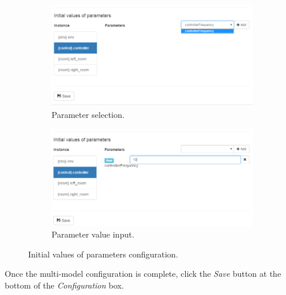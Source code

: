 %
%
%
\begin{figure}[ht]
  \centering
  \begin{subfigure}[b]{0.8\textwidth}
    \includegraphics[width=\textwidth]{figures/app/mm-params}
    \caption{Parameter selection.}
    \label{fig:mm-params1}
  \end{subfigure}
  \quad
  \begin{subfigure}[b]{0.8\textwidth}
    \includegraphics[width=\textwidth]{figures/app/mm-params2}
    \caption{Parameter value input.} 
    \label{fig:mm-params2}
  \end{subfigure}
  \caption{Initial values of parameters configuration.}
  \label{fig:mm-params}
\end{figure}
%
%
%
Once the multi-model configuration is complete, click the \textit{Save}
button at the bottom of the \textit{Configuration} box.
%
\clearpage
%
%
%
